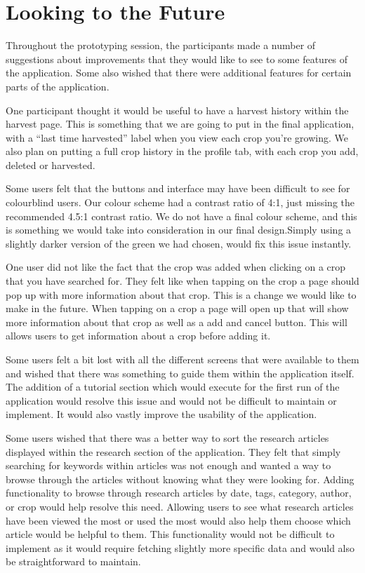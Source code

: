\documentclass[12pt,letterpaper]{article}
\begin{document}
\section{Looking to the Future}
Throughout the prototyping session, the participants made a number of suggestions about improvements that they would like to see to some features of the application. Some also wished that there were additional features for certain parts of the application.\par	
One participant thought it would be useful to have a harvest history within the harvest page. This is something that we are going to put in the final application, with a “last time harvested” label when you view each crop you’re growing. We also plan on putting a full crop history in the profile tab, with each crop you add, deleted or harvested.\par
	Some users felt that the buttons and interface may have been difficult to see for colourblind users. Our colour scheme had a contrast ratio of 4:1, just missing the recommended 4.5:1 contrast ratio. We do not have a final colour scheme, and this is something we would take into consideration in our final design.Simply using a slightly darker version of the green we had chosen, would fix this issue instantly.\par
	One user did not like the fact that the crop was added when clicking on a crop that you have searched for. They felt like when tapping on the crop a page should pop up with more information about that crop. This is a change we would like to make in the future. When tapping on a crop a page will open up that will show more information about that crop as well as a add and cancel button. This will allows users to get information about a crop before adding it.\par
Some users felt a bit lost with all the different screens that were available to them and wished that there was something to guide them within the application itself. The addition of a tutorial section which would execute for the first run of the application would resolve this issue and would not be difficult to maintain or implement. It would also vastly improve the usability of the application.\par
Some users wished that there was a better way to sort the research articles displayed within the research section of the application. They felt that simply searching for keywords within articles was not enough and wanted a way to browse through the articles without knowing what they were looking for. Adding functionality to browse through research articles by date, tags, category, author, or crop would help resolve this need. Allowing users to see what research articles have been viewed the most or used the most would also help them choose which article would be helpful to them. This functionality would not be difficult to implement as it would require fetching slightly more specific data and would also be straightforward to maintain.\par
\end{document}
